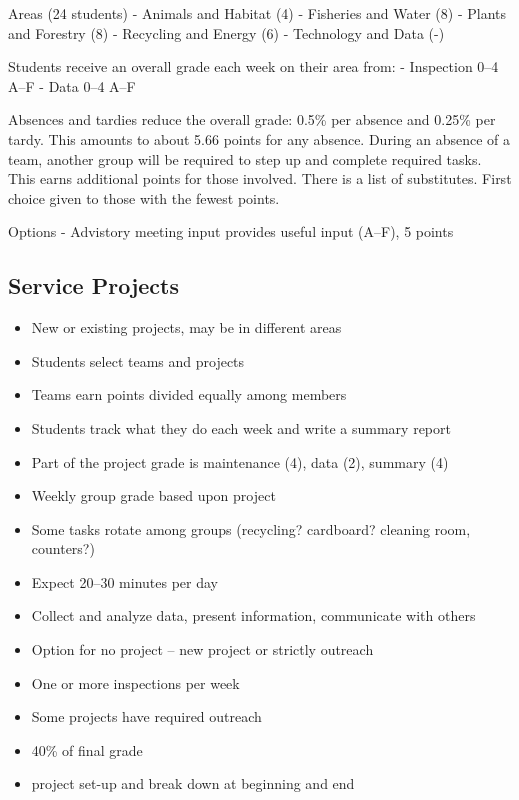 \documentclass[letterpaper,10pt]{memoir}
\begin{document}
Areas (24 students)
- Animals and Habitat	(4)
- Fisheries and Water	(8)
- Plants and Forestry	(8)
- Recycling and Energy	(6)
- Technology and Data	(-)

Students receive an overall grade each week on their area from:
- Inspection	0--4		A--F
- Data			0--4		A--F

Absences and tardies reduce the overall grade: 0.5\% per absence and 0.25\% per tardy. This amounts to about 5.66 points for any absence. During an absence of a team, another group will be required to step
up and complete required tasks. This earns additional points for those involved. There is a list of
substitutes. First choice given to those with the fewest points.

Options
- Advistory meeting input
	provides useful input (A--F), 5 points






\subsection*{Service Projects}



\begin{itemize}[label=$-$,nosep]
\item New or existing projects, may be in different areas
\item Students select teams and projects
\item Teams earn points divided equally among members
\item Students track what they do each week and write a summary report
\item Part of the project grade is maintenance (4), data (2), summary (4)
\item Weekly group grade based upon project
\item Some tasks rotate among groups (recycling? cardboard? cleaning room, counters?)
\item Expect 20--30 minutes per day
\item Collect and analyze data, present information, communicate with others
\item Option for no project -- new project or strictly outreach
\item One or more inspections per week
\item Some projects have required outreach
\item 40\% of final grade
\item project set-up and break down at beginning and end
\end{itemize}
\end{document}
